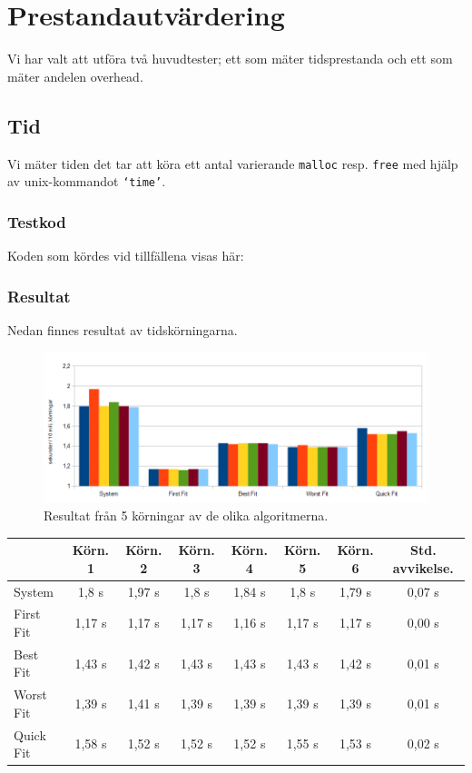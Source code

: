 \documentclass[a4paper,10pt,titlepage]{article}
\begin{document}
\newpage
\section{Prestandautvärdering}


Vi har valt att utföra två huvudtester; ett som mäter tidsprestanda och ett som mäter andelen overhead.

\subsection{Tid}

Vi mäter tiden det tar att köra ett antal varierande \texttt{malloc} resp. \texttt{free} med hjälp av unix-kommandot \texttt{`time'}.


\subsubsection{Testkod}

Koden som kördes vid tillfällena visas här:

\footnotesize{}

\subsubsection{Resultat}

Nedan finnes resultat av tidskörningarna.
\begin{figure}[H]
	\includegraphics[width=\textwidth]{time.png}
	\caption{Resultat från 5 körningar av de olika algoritmerna.}
\end{figure}
\begin{tabular}{| l | c | c | c | c | c | c | c |}
		\hline
		 & Körn. 1	& Körn. 2	& Körn. 3	& Körn. 4	& Körn. 5	& Körn. 6	& Std. avvikelse. \\
		\hline
		System		& 1,8 s			& 1,97 s	& 1,8 s		& 1,84 s	& 1,8 s		& 1,79 s	& 0,07 s \\
		First Fit	& 1,17 s		& 1,17 s	& 1,17 s	& 1,16 s	& 1,17 s	& 1,17 s	& 0,00 s \\
		Best Fit	& 1,43 s		& 1,42 s	& 1,43 s	& 1,43 s	& 1,43 s	& 1,42 s	& 0,01 s \\
		Worst Fit	& 1,39 s		& 1,41 s	& 1,39 s	& 1,39 s	& 1,39 s	& 1,39 s	& 0,01 s \\
		Quick Fit	& 1,58 s		& 1,52 s	& 1,52 s	& 1,52 s	& 1,55 s	& 1,53 s	& 0,02 s \\
		\hline
\end{tabular}
\end{document}
